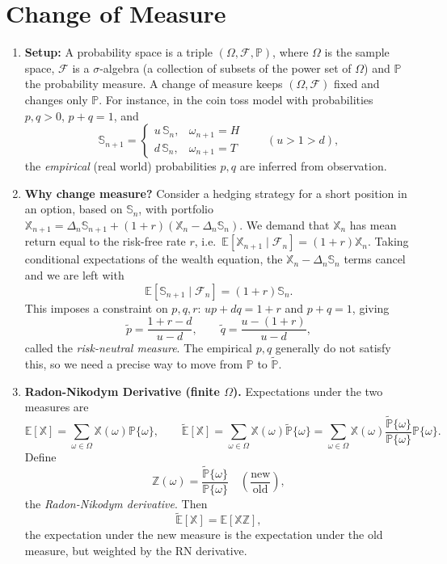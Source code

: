 
\section{Change of Measure}

\begin{enumerate}
    \item \textbf{Setup:} A probability space is a triple $(\Omega, \mathcal{F}, \mathbb{P})$, where $\Omega$ is the sample space, $\mathcal{F}$ is a $\sigma$-algebra (a collection of subsets of the power set of $\Omega$) and $\mathbb{P}$ the probability measure. A change of measure keeps $(\Omega, \mathcal{F})$ fixed and changes only $\mathbb{P}$. For instance, in the coin toss model with probabilities $p, q > 0$, $p + q = 1$, and
    \[\mathbb{S}_{n+1} = \begin{cases}
        u\, \mathbb{S}_n, & \omega_{n+1} = H \\
        d\, \mathbb{S}_n, & \omega_{n+1} = T
    \end{cases} \qquad (u > 1 > d),\]
    the \textit{empirical} (real world) probabilities $p, q$ are inferred from observation.

    \item \textbf{Why change measure?} Consider a hedging strategy for a short position in an option, based on $\mathbb{S}_n$, with portfolio $\mathbb{X}_{n+1} = \Delta_n \mathbb{S}_{n+1} + (1+r)(\mathbb{X}_n - \Delta_n \mathbb{S}_n)$. We demand that $\mathbb{X}_n$ has mean return equal to the risk-free rate $r$, i.e.\ $\mathbb{E}[\mathbb{X}_{n+1} \mid \mathcal{F}_n] = (1+r)\mathbb{X}_n$. Taking conditional expectations of the wealth equation, the $\mathbb{X}_n - \Delta_n \mathbb{S}_n$ terms cancel and we are left with
    \[\mathbb{E}[\mathbb{S}_{n+1} \mid \mathcal{F}_n] = (1+r)\mathbb{S}_n.\]
    This imposes a constraint on $p, q, r$: $u p + d q = 1 + r$ and $p + q = 1$, giving
    \[\tilde{p} = \frac{1 + r - d}{u - d}, \qquad \tilde{q} = \frac{u - (1+r)}{u - d},\]
    called the \textit{risk-neutral measure}. The empirical $p, q$ generally do not satisfy this, so we need a precise way to move from $\mathbb{P}$ to $\tilde{\mathbb{P}}$.

    \item \textbf{Radon-Nikodym Derivative (finite $\Omega$).} Expectations under the two measures are
    \[\mathbb{E}[\mathbb{X}] = \sum_{\omega \in \Omega}\mathbb{X}(\omega)\mathbb{P}\{\omega\}, \qquad \tilde{\mathbb{E}}[\mathbb{X}] = \sum_{\omega \in \Omega}\mathbb{X}(\omega)\tilde{\mathbb{P}}\{\omega\} = \sum_{\omega \in \Omega}\mathbb{X}(\omega)\frac{\tilde{\mathbb{P}}\{\omega\}}{\mathbb{P}\{\omega\}}\mathbb{P}\{\omega\}.\]
    Define
    \[\mathbb{Z}(\omega) = \frac{\tilde{\mathbb{P}}\{\omega\}}{\mathbb{P}\{\omega\}} \quad \left(\frac{\text{new}}{\text{old}}\right),\]
    the \textit{Radon-Nikodym derivative}. Then
    \[\tilde{\mathbb{E}}[\mathbb{X}] = \mathbb{E}[\mathbb{X}\mathbb{Z}],\]
    the expectation under the new measure is the expectation under the old measure, but weighted by the RN derivative.


\end{enumerate}
